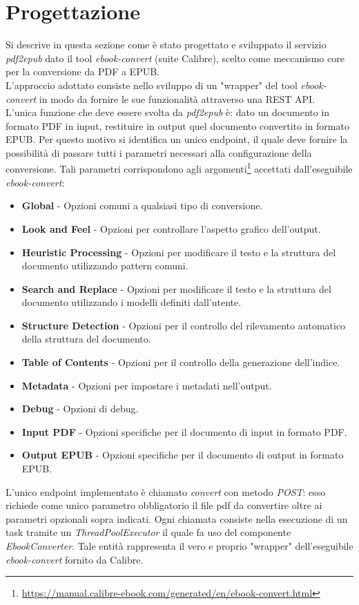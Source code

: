 \section{Progettazione}
Si descrive in questa sezione come è stato progettato e sviluppato il servizio \textit{pdf2epub} dato il tool \textit{ebook-convert} (suite Calibre), scelto come meccanismo core per la conversione da PDF a EPUB.\\
L'approccio adottato consiste nello sviluppo di un "wrapper" del tool \textit{ebook-convert} in modo da fornire le sue funzionalità attraverso una REST API.\\
L'unica funzione che deve essere svolta da \textit{pdf2epub} è: dato un documento in formato PDF in input, restituire in output quel documento convertito in formato EPUB. Per questo motivo si identifica un unico endpoint, il quale deve fornire la possibilità di passare tutti i parametri necessari alla configurazione della conversione. Tali parametri corrispondono agli argomenti\footnote{\url{https://manual.calibre-ebook.com/generated/en/ebook-convert.html}} accettati dall'eseguibile \textit{ebook-convert}:
\begin{itemize}
    \item \textbf{Global} - Opzioni comuni a qualsiasi tipo di conversione.
    \item \textbf{Look and Feel} - Opzioni per controllare l'aspetto grafico dell'output.
    \item \textbf{Heuristic Processing} - Opzioni per modificare il testo e la struttura del documento utilizzando pattern comuni.
    \item \textbf{Search and Replace} - Opzioni per modificare il testo e la struttura del documento utilizzando i modelli definiti dall'utente.
    \item \textbf{Structure Detection} - Opzioni per il controllo del rilevamento automatico della struttura del documento.
    \item \textbf{Table of Contents} - Opzioni per il controllo della generazione dell'indice.
    \item \textbf{Metadata} - Opzioni per impostare i metadati nell'output.
    \item \textbf{Debug} - Opzioni di debug.
    \item \textbf{Input PDF} - Opzioni specifiche per il documento di input in formato PDF.
    \item \textbf{Output EPUB} - Opzioni specifiche per il documento di output in formato EPUB.
\end{itemize}
L'unico endpoint implementato è chiamato \textit{convert} con metodo \textit{POST}: esso richiede come unico parametro obbligatorio il file pdf da convertire oltre ai parametri opzionali sopra indicati. Ogni chiamata consiste nella esecuzione di un task tramite un \textit{ThreadPoolExecutor} il quale fa uso del componente \textit{EbookConverter}. Tale entità rappresenta il vero e proprio "wrapper" dell'eseguibile \textit{ebook-convert} fornito da Calibre.


